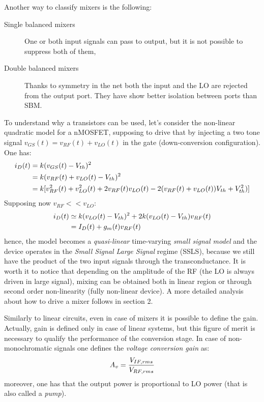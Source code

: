 Another way to classify mixers is the following:
\begin{description}
	\item [Single balanced mixers] One or both input signals can pass to output, but it is not possible to suppress both of them,
	\item [Double balanced mixers] Thanks to symmetry in the net both the input and the LO are rejected from the output port. They have show better isolation between ports than SBM. 
\end{description}
To understand why a transistors can be used, let's consider the non-linear quadratic model for a nMOSFET, supposing to drive that by injecting a two tone signal $v_{GS}(t)=v_{RF}(t)+v_{LO}(t)$ in the gate (down-conversion configuration). One has:
\begin{align}
i_D(t) &= k(v_{GS}(t)-V_{th})^2 \notag \\
& = k(v_{RF}(t)+v_{LO}(t)-V_{th})^2 \notag \\
& = k[v_{RF}^2(t)+v_{LO}^2(t)+2v_{RF}(t)v_{LO}(t)-2(v_{RF}(t)+v_{LO}(t))V_{th}+V_{th}^2)] \notag
\end{align}
Supposing now $v_{RF}<<v_{LO}$:
\begin{align}
i_D(t) &\simeq k(v_{LO}(t)-V_{th})^2+2k(v_{LO}(t)-V_{th})v_{RF}(t) \notag  \\
& = I_D(t)+g_m(t)v_{RF}(t) \notag
\end{align}
hence, the model becomes a \emph{quasi-linear} time-varying \emph{small signal model} and the device operates in the \emph{Small Signal Large Signal} regime (SSLS), because we still have the product of the two input signals through the transconductance. It is worth it to notice that depending on the amplitude of the RF (the LO is always driven in large signal), mixing can be obtained both in linear region or through second order non-linearity (fully non-linear device).
A more detailed analysis about how to drive a mixer follows in section 2.

Similarly to linear circuits, even in case of mixers it is possible to define the gain. Actually, gain is defined only in case of linear systems, but this figure of merit is necessary to qualify the performance of the conversion stage.
In case of non-monochromatic signals one defines the \emph{voltage conversion gain} as:
\begin{equation}
	A_v= \frac{V_{IF,rms}}{V_{RF,rms}} \notag
\end{equation}
moreover, one has that the output power is proportional to LO power (that is also called a \emph{pump}).

